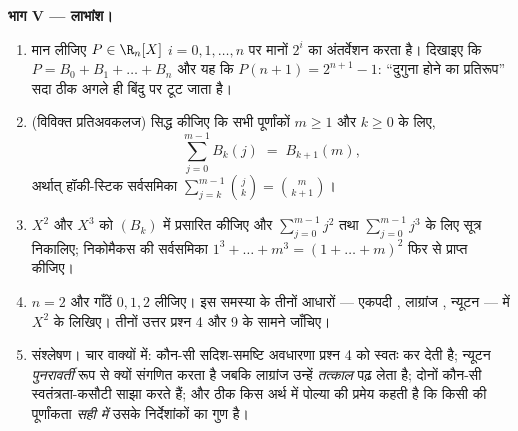 \begin{problem}
\medskip \noindent\textbf{भाग V --- लाभांश।}
\begin{enumerate}[resume]
  \item मान लीजिए $P \in \R_n[X]$ $i = 0, 1, \dots, n$ पर मानों $2^i$ का
  अंतर्वेशन करता है। दिखाइए कि $P = B_0 + B_1 + \dots + B_n$ और यह कि $P(n +
  1) = 2^{n+1} - 1$: ``दुगुना होने का प्रतिरूप'' सदा ठीक अगले ही बिंदु पर
  टूट जाता है।
  \item (विविक्त प्रतिअवकलज) सिद्ध कीजिए कि सभी पूर्णांकों $m \geq 1$ और $k
  \geq 0$ के लिए,
        \[
        \sum_{j=0}^{m-1} B_k(j) \;=\; B_{k+1}(m),
        \]
        अर्थात् हॉकी-स्टिक सर्वसमिका $\sum_{j=k}^{m-1} \binom{j}{k} =
        \binom{m}{k+1}$।
  \item $X^2$ और $X^3$ को  $(B_k)$ में प्रसारित कीजिए और
  $\sum_{j=0}^{m-1} j^2$ तथा $\sum_{j=0}^{m-1} j^3$ के लिए  सूत्र
  निकालिए; निकोमैकस की सर्वसमिका $1^3 + \dots + m^3 = (1 + \dots + m)^2$ फिर
  से प्राप्त कीजिए।
  \item $n = 2$ और गाँठें $0, 1, 2$ लीजिए। इस समस्या के तीनों आधारों ---
  एकपदी , लाग्रांज , न्यूटन  --- में $X^2$ के  लिखिए।
  तीनों उत्तर प्रश्न 4 और 9 के सामने जाँचिए।
  \item संश्लेषण। चार वाक्यों में: कौन-सी सदिश-समष्टि अवधारणा प्रश्न 4 को
  स्वतः कर देती है; न्यूटन   \emph{पुनरावर्ती} रूप से क्यों
  संगणित करता है जबकि लाग्रांज  उन्हें \emph{तत्काल} पढ़ लेता है; दोनों
   कौन-सी स्वतंत्रता-कसौटी साझा करते हैं; और ठीक किस अर्थ में पोल्या की
  प्रमेय कहती है कि किसी  की पूर्णांकता \emph{सही  में} उसके
  निर्देशांकों का गुण है।
\end{enumerate}
\end{problem}

